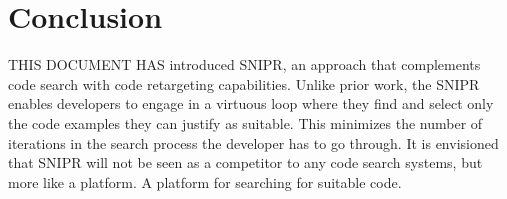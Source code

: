 \chapter{Conclusion}{}
\label{sec:conclusion}

\lettrine[lraise=0.1, nindent=0em, slope=-.5em]{T}{HIS DOCUMENT HAS} introduced \uppercase{SnipR}, an approach that complements code search with code retargeting capabilities. Unlike prior work, the \uppercase{SnipR} enables developers to engage in a virtuous loop where they find and select only the code examples they can justify as suitable. This minimizes the number of iterations in the search process the developer has to go through. It is envisioned that \uppercase{SnipR} will not be seen as a competitor to any code search systems, but more like a platform. A platform for searching for suitable code. 